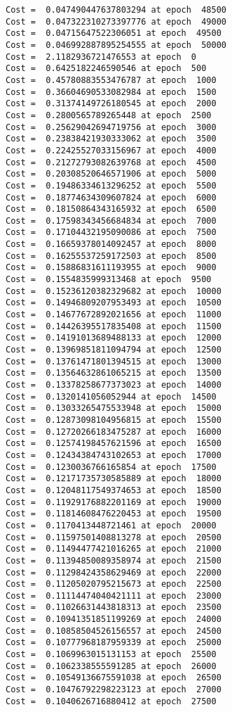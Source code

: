 \documentclass[11pt]{article}
\begin{document}
\begin{Verbatim}[commandchars=\\\{\}]
Cost =  0.047490447637803294 at epoch  48500
Cost =  0.047322310273397776 at epoch  49000
Cost =  0.04715647522306051 at epoch  49500
Cost =  0.046992887895254555 at epoch  50000
Cost =  2.1182936721476553 at epoch  0
Cost =  0.6425182246590546 at epoch  500
Cost =  0.45780883553476787 at epoch  1000
Cost =  0.36604690533082984 at epoch  1500
Cost =  0.31374149726180545 at epoch  2000
Cost =  0.2800565789265448 at epoch  2500
Cost =  0.25629042694719756 at epoch  3000
Cost =  0.23838421930333062 at epoch  3500
Cost =  0.22425527033156967 at epoch  4000
Cost =  0.21272793082639768 at epoch  4500
Cost =  0.20308520646571906 at epoch  5000
Cost =  0.19486334613296252 at epoch  5500
Cost =  0.18774634309607824 at epoch  6000
Cost =  0.18150864343165932 at epoch  6500
Cost =  0.17598343456684834 at epoch  7000
Cost =  0.17104432195090086 at epoch  7500
Cost =  0.16659378014092457 at epoch  8000
Cost =  0.16255537259172503 at epoch  8500
Cost =  0.15886831611193955 at epoch  9000
Cost =  0.1554835999313468 at epoch  9500
Cost =  0.15236120382329682 at epoch  10000
Cost =  0.14946809207953493 at epoch  10500
Cost =  0.14677672892021656 at epoch  11000
Cost =  0.14426395517835408 at epoch  11500
Cost =  0.14191013689488133 at epoch  12000
Cost =  0.13969851811094794 at epoch  12500
Cost =  0.13761471801394515 at epoch  13000
Cost =  0.13564632861065215 at epoch  13500
Cost =  0.13378258677373023 at epoch  14000
Cost =  0.1320141056052944 at epoch  14500
Cost =  0.13033265475533948 at epoch  15000
Cost =  0.12873098104956815 at epoch  15500
Cost =  0.12720266183475287 at epoch  16000
Cost =  0.12574198457621596 at epoch  16500
Cost =  0.12434384743102653 at epoch  17000
Cost =  0.1230036766165854 at epoch  17500
Cost =  0.12171735730585889 at epoch  18000
Cost =  0.12048117549374653 at epoch  18500
Cost =  0.11929176882201169 at epoch  19000
Cost =  0.11814608476220453 at epoch  19500
Cost =  0.1170413448721461 at epoch  20000
Cost =  0.11597501408813278 at epoch  20500
Cost =  0.11494477421016265 at epoch  21000
Cost =  0.11394850089358974 at epoch  21500
Cost =  0.11298424358629469 at epoch  22000
Cost =  0.11205020795215673 at epoch  22500
Cost =  0.11114474040421111 at epoch  23000
Cost =  0.11026631443818313 at epoch  23500
Cost =  0.10941351851199269 at epoch  24000
Cost =  0.10858504526156557 at epoch  24500
Cost =  0.10777968187959339 at epoch  25000
Cost =  0.1069963015131153 at epoch  25500
Cost =  0.1062338555591285 at epoch  26000
Cost =  0.10549136675591038 at epoch  26500
Cost =  0.10476792298223123 at epoch  27000
Cost =  0.1040626716880412 at epoch  27500

\end{Verbatim}
\end{document}
